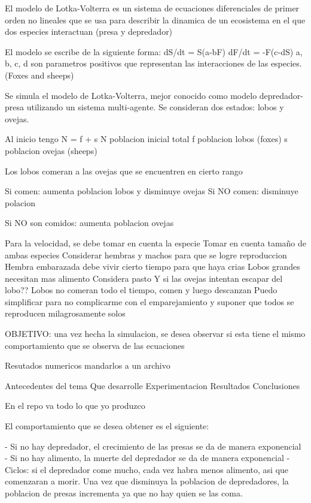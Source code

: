 El modelo de Lotka-Volterra es un sistema de ecuaciones diferenciales de primer orden no lineales que se usa para describir la dinamica de un ecosistema en el que dos especies interactuan (presa y depredador)

El modelo se escribe de la siguiente forma:
dS/dt = S(a-bF)
dF/dt = -F(c-dS) 
a, b, c, d son parametros positivos que representan las interacciones de las especies.
(Foxes and sheeps)



Se simula el modelo de Lotka-Volterra, mejor conocido como modelo depredador-presa utilizando un sistema multi-agente.
Se consideran dos estados: lobos y ovejas.

Al inicio tengo N = f + s
N poblacion inicial total
f poblacion lobos (foxes)
s poblacion ovejas (sheeps)

Los lobos comeran a las ovejas que se encuentren en cierto rango

Si comen: aumenta poblacion lobos y disminuye ovejas
Si NO comen: disminuye polacion

Si NO son comidos: aumenta poblacion ovejas


Para la velocidad, se debe tomar en cuenta la especie
Tomar en cuenta tamaño de ambas especies
Considerar hembras y machos para que se logre reproduccion
Hembra embarazada debe vivir cierto tiempo para que haya crias
Lobos grandes necesitan mas alimento
Considera pasto
Y si las ovejas intentan escapar del lobo??
Lobos no comeran todo el tiempo, comen y luego descanzan
Puedo simplificar para no complicarme con el emparejamiento y suponer que todos se reproducen milagrosamente solos

OBJETIVO:
una vez hecha la simulacion, se desea observar si esta tiene el mismo comportamiento que se observa de las ecuaciones

Resutados numericos mandarlos a un archivo

Antecedentes del tema
Que desarrolle
Experimentacion
Resultados
Conclusiones

En el repo va todo lo que yo produzco


El comportamiento que se desea obtener es el siguiente:

- Si no hay depredador, el crecimiento de las presas se da de manera exponencial
- Si no hay alimento, la muerte del depredador se da de manera exponencial
- Ciclos: si el depredador come mucho, cada vez habra menos alimento, asi que comenzaran a morir. Una vez que disminuya la poblacion de depredadores, la poblacion de presas incrementa ya que no hay quien se las coma.
